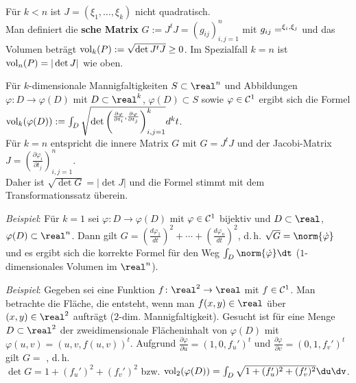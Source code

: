 Für $k < n$ ist $J = (\xi_1, \dotsc, \xi_k)$ nicht quadratisch. \\
Man definiert die \textbf{sche Matrix}
$G := J^t J = (g_{ij})_{i,j=1}^n$ mit
$g_{ij} = \sp{\xi_i, \xi_j}$ und das Volumen beträgt
${\operatorname{vol}}_k(P) := \sqrt{\det J^t J} \ge 0$.
Im Spezialfall $k = n$ ist ${\operatorname{vol}}_n(P) = |\det J|$ wie oben.

\linie

Für $k$-dimensionale Mannigfaltigkeiten $S \subset \real^n$
und Abbildungen
$\varphi\colon D \rightarrow \varphi(D)$ mit $D \subset \real^k$,
$\varphi(D) \subset S$ sowie $\varphi \in \mathcal{C}^1$ ergibt sich die Formel
${\operatorname{vol}}_k(\varphi(D)) := \int_D \sqrt{\det\left(\sp{\frac{\partial
\varphi}{\partial t_i}, \frac{\partial
\varphi}{\partial t_j}}\right)_{i,j=1}^k} d^k t$. \\
Für $k = n$ entspricht die innere Matrix $G$ mit $G = J^t J$
und der Jacobi-Matrix
$J = \left(\frac{\partial \varphi_i}{\partial t_j}\right)_{i,j=1}^n$. \\
Daher ist $\sqrt{\det G} = |\det J|$ und die Formel stimmt mit dem
Transformationssatz überein.

\linie

\emph{Beispiel}:
Für $k = 1$ sei $\varphi\colon D \rightarrow \varphi(D)$ mit
$\varphi \in \mathcal{C}^1$ bijektiv und $D \subset \real$,
$\varphi(D) \subset \real^n$.
Dann gilt $G = \left(\frac{d \varphi_1}{dt}\right)^2 + \dotsb +
\left(\frac{d \varphi_n}{dt}\right)^2$, d.\,h.
$\sqrt{G} = \norm{\dot{\varphi}}$ und es ergibt sich die korrekte Formel für
den Weg $\int_D \norm{\dot{\varphi}} \dt$
($1$-dimensionales Volumen im $\real^n$).

\linie

\emph{Beispiel}:
Gegeben sei eine Funktion $f\colon \real^2 \rightarrow \real$ mit $f \in \mathcal{C}^1$.
Man betrachte die Fläche, die entsteht, wenn man $f(x, y) \in \real$ über
$(x, y) \in \real^2$ aufträgt ($2$-dim. Mannigfaltigkeit).
Gesucht ist für eine Menge $D \subset \real^2$ der zweidimensionale
Flächeninhalt von $\varphi(D)$ mit
$\varphi(u, v) = (u, v, f(u, v))^t$.
Aufgrund $\frac{\partial \varphi}{\partial u} = (1, 0, f_u')^t$ und
$\frac{\partial \varphi}{\partial v} = (0, 1, f_v')^t$ gilt
$G =$ , d.\,h. \\
$\det G = 1 + (f_u')^2 + (f_v')^2$ bzw.
$\vol_2(\varphi(D)) = \int_D \sqrt{1 + (f_u')^2 + (f_v')^2} \du\dv$.


